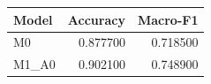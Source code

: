 \begin{tabular}{lrr}
\toprule
Model & Accuracy & Macro-F1 \\
\midrule
M0 & 0.877700 & 0.718500 \\
M1_A0 & 0.902100 & 0.748900 \\
\bottomrule
\end{tabular}
